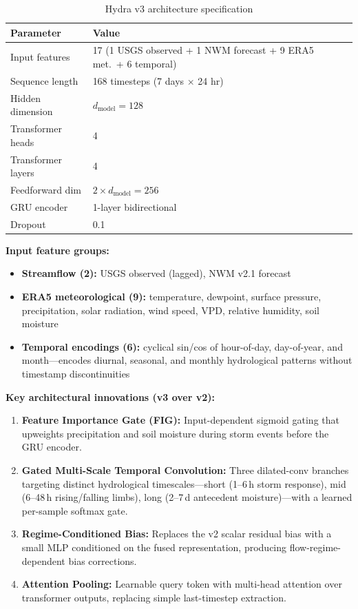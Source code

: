 \documentclass[11pt]{article}
\begin{document}
\begin{table}[h]
\centering
\caption{Hydra v3 architecture specification}
\begin{tabular}{ll}
\toprule
\textbf{Parameter} & \textbf{Value} \\
\midrule
Input features         & 17 (1 USGS observed + 1 NWM forecast + 9 ERA5 met.\ + 6 temporal) \\
Sequence length        & 168 timesteps (7 days $\times$ 24 hr) \\
Hidden dimension       & $d_{\mathrm{model}} = 128$ \\
Transformer heads      & 4 \\
Transformer layers     & 4 \\
Feedforward dim        & $2 \times d_{\mathrm{model}} = 256$ \\
GRU encoder            & 1-layer bidirectional \\
Dropout                & 0.1 \\
\bottomrule
\end{tabular}
\end{table}

\textbf{Input feature groups:}
\begin{itemize}
    \item \textbf{Streamflow (2):} USGS observed (lagged), NWM v2.1 forecast
    \item \textbf{ERA5 meteorological (9):} temperature, dewpoint, surface pressure, precipitation, solar radiation, wind speed, VPD, relative humidity, soil moisture
    \item \textbf{Temporal encodings (6):} cyclical sin/cos of hour-of-day, day-of-year, and month---encodes diurnal, seasonal, and monthly hydrological patterns without timestamp discontinuities
\end{itemize}

\textbf{Key architectural innovations (v3 over v2):}
\begin{enumerate}
    \item \textbf{Feature Importance Gate (FIG):} Input-dependent sigmoid gating that upweights precipitation and soil moisture during storm events before the GRU encoder.
    \item \textbf{Gated Multi-Scale Temporal Convolution:} Three dilated-conv branches targeting distinct hydrological timescales---short (1--6\,h storm response), mid (6--48\,h rising/falling limbs), long (2--7\,d antecedent moisture)---with a learned per-sample softmax gate.
    \item \textbf{Regime-Conditioned Bias:} Replaces the v2 scalar residual bias with a small MLP conditioned on the fused representation, producing flow-regime-dependent bias corrections.
    \item \textbf{Attention Pooling:} Learnable query token with multi-head attention over transformer outputs, replacing simple last-timestep extraction.
\end{enumerate}
\end{document}
